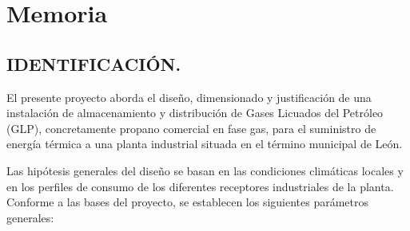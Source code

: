 \documentclass[12pt]{article}
\begin{document}

\hypersetup{linkcolor=black}

\tableofcontents\thispagestyle{empty}


\hypersetup{
    linkcolor=blue,
    citecolor=blue,
    urlcolor=blue
}




    \setcounter{section}{1} %
    \section{Memoria}
    \label{Memoria}

        \subsection{IDENTIFICACIÓN.}
        El presente proyecto aborda el diseño, dimensionado y justificación de una instalación de almacenamiento y distribución de Gases Licuados del Petróleo (GLP), concretamente propano comercial en fase gas, para el suministro de energía térmica a una planta industrial situada en el término municipal de León.
        
        Las hipótesis generales del diseño se basan en las condiciones climáticas locales y en los perfiles de consumo de los diferentes receptores industriales de la planta. Conforme a las bases del proyecto, se establecen los siguientes parámetros generales:
        
\end{document}
